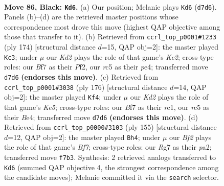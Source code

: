 \documentclass[11pt]{article}
\begin{document}
\clearpage

\begin{figure}[p]\centering
\begin{subfigure}{0.46\textwidth}\centering
\resizebox{\linewidth}{!}{%
\newchessgame
\chessboard[
  setfen={1R6/3k1br1/8/1PR5/4K3/8/8/8 b - - 0 86},
  showmover=false,
  pgfstyle=straightmove, color=movearrow, markmove={d7-d6}
]}
\caption{}
\end{subfigure}\hfill
\begin{subfigure}{0.46\textwidth}\centering
\resizebox{\linewidth}{!}{%
\newchessgame
\chessboard[
  setfen={8/8/3k4/8/1r2p3/8/R1K2P2/8 w - - 2 88},
  showmover=false,
  pgfstyle=straightmove, color=movearrow, markmove={c2-c3}
]}
\caption{}
\end{subfigure}
\\[4pt]
\begin{subfigure}{0.46\textwidth}\centering
\resizebox{\linewidth}{!}{%
\newchessgame
\chessboard[
  setfen={8/8/8/2p1K2p/4B3/1R6/5k2/2r5 w - - 3 89},
  showmover=false,
  pgfstyle=straightmove, color=movearrow, markmove={e5-f4}
]}
\caption{}
\end{subfigure}\hfill
\begin{subfigure}{0.46\textwidth}\centering
\resizebox{\linewidth}{!}{%
\newchessgame
\chessboard[
  setfen={2r5/8/4P1k1/1K2R3/8/8/P4b2/8 b - - 4 78},
  showmover=false,
  pgfstyle=straightmove, color=movearrow, markmove={f2-h4}
]}
\caption{}
\end{subfigure}
\caption{\textbf{Move 86, Black: \texttt{Kd6}.} (a) Our position; Melanie plays \texttt{Kd6} (\texttt{d7d6}). Panels (b)--(d) are the retrieved master positions whose correspondence most drove this move (highest QAP objective among those that transfer to it). (b) Retrieved from \texttt{ccrl\_top\_p0001\#1233} (ply 174) [structural distance $d$=15, QAP obj=2]: the master played \texttt{Kc3}; under $\mu$ our \emph{Kd2} plays the role of that game's \emph{Kc2}; cross-type roles: our \emph{B}f7 as their \emph{P}f2, our \emph{r}c5 as their \emph{p}e4; transferred move \texttt{d7d6} \textbf{(endorses this move)}. (c) Retrieved from \texttt{ccrl\_top\_p0001\#3038} (ply 176) [structural distance $d$=14, QAP obj=2]: the master played \texttt{Kf4}; under $\mu$ our \emph{Kd2} plays the role of that game's \emph{Ke5}; cross-type roles: our \emph{B}f7 as their \emph{r}c1, our \emph{r}c5 as their \emph{B}e4; transferred move \texttt{d7d6} \textbf{(endorses this move)}. (d) Retrieved from \texttt{ccrl\_top\_p0000\#3103} (ply 155) [structural distance $d$=12, QAP obj=2]: the master played \texttt{Bh4}; under $\mu$ our \emph{Bf2} plays the role of that game's \emph{Bf7}; cross-type roles: our \emph{R}g7 as their \emph{p}a2; transferred move \texttt{f7b3}. Synthesis: 2 retrieved analogs transferred to \texttt{Kd6} (summed QAP objective 4, the strongest correspondence among the candidate moves); Melanie committed it via the \texttt{search} selector.}
\label{fig:thought-m171}
\end{figure}
\end{document}
